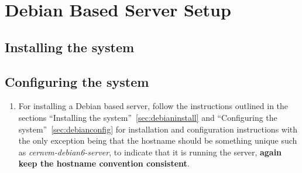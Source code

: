\begin{enumerate}
\begin{comment}
\item 	Finally, ssh login to one of the test machine that was set up earlier, \emph{in our examples, cernvm-host} and send another 
		sample test report to the tapper server, to ensure that the web interface, MCP, database, and reports framework are all working 
		by viewing the tapper reports in your browser at the following url: \url{http://localhost/tapper/reports} You should now see a
		report from whatever the ``Tapper-Machine-Name'' in demo\_report.tap was set as. \emph{For the example demo\_report.tap provided 
		below it would be cernvm-testclient}.
\lstset{caption= Send a Report to the \tapper~Server from a Test Client}
\begin{lstlisting}
# Save the following in a file named demo_report.tap
$ vi demo_report.tap

	1..2
	# Tapper-Suite-Name: Tapper-Deployment
	# Tapper-Suite-Version: 1.001
	# Tapper-Machine-Name: cernvm-testclient
	ok - Hello test world
	ok - Just another description

# Send the report to the tapper server using netcat
$ cat demo_report.tap | netcat -q7 -w1 cernvm-server 7357
\end{lstlisting}

\item	Now that it has been verified that the tapper server, including the web interface, MCP, database, and reports framework 
		are all working; return to the sections titled ``Setting up the Tapper Test Suite''	for each of the test client, as 
		there are unique instructions for each operating system.
\end{comment}
\end{enumerate}




\section{Debian Based Server Setup}
\subsection{Installing the system}
\subsection{Configuring the system}
\flushleft
\begin{enumerate}
\item 	For installing a Debian based server, follow the instructions outlined in the sections ``Installing the 
		system''~\ref{sec:debianinstall} and ``Configuring the system''~\ref{sec:debianconfig} for installation and configuration 
		instructions with the only exception being that the hostname should be something unique such as \emph{cernvm-debian6-server}, to 
		indicate that it is running the \tapper server, {\bf again keep the hostname convention consistent}.
\end{enumerate}

